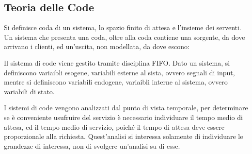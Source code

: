 \documentclass{article}
\numberwithin{equation}{subsection}
\begin{document}
\subsection{Teoria delle Code}

Si definisce coda di un sistema, lo spazio finito di attesa e l'insieme dei serventi. Un sistema che presenta una coda, oltre alla coda contiene una sorgente, da dove 
arrivano i clienti, ed un'uscita, non modellata, da dove escono:
\begin{center}
\end{center} 

Il sistema di code viene gestito tramite disciplina FIFO. Dato un sistema, si definiscono variaibli esogene, variabili esterne al sista, ovvero segnali di input, mentre 
si definiscono variabili endogene, variaibli interne al sistema, ovvero variabili di stato. 

I sistemi di code vengono analizzati dal punto di vista temporale, per determinare se è conveniente usufruire del servizio è necessario individuare il tempo medio di attesa, 
ed il tempo medio di servizio, poiché il tempo di attesa deve essere proporzionale alla richiesta. Quest'analisi si interessa solamente di individuare le grandezze di 
interessa, non di svolgere un'analisi su di esse. 
\end{document}

